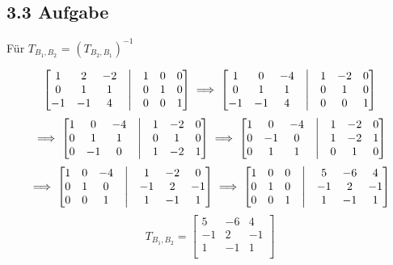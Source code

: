 \documentclass{report}
\begin{document}
\subsection*{3.3 Aufgabe}

Für $T_{B_1,B_2}$ = $(T_{B_2,B_1})^{-1}$

\[
\begin{bmatrix}
    1 & 2 & -2  &\bigm| & 1 & 0 & 0 \\
    0 & 1 & 1   &\bigm| & 0 & 1 & 0 \\
    -1 & -1 & 4  &\bigm| & 0 & 0 & 1 \\ 
\end{bmatrix} \implies
\begin{bmatrix}
    1 & 0 & -4  &\bigm| & 1 & -2 & 0 \\
    0 & 1 & 1   &\bigm| & 0 & 1 & 0 \\
    -1 & -1 & 4  &\bigm| & 0 & 0 & 1 \\ 
\end{bmatrix} 
\]
\[
\implies\begin{bmatrix}
    1 & 0 & -4  &\bigm| & 1 & -2 & 0 \\
    0 & 1 & 1   &\bigm| & 0 & 1 & 0 \\
    0 & -1 & 0  &\bigm| & 1 & -2 & 1 \\ 
\end{bmatrix} \implies
\begin{bmatrix}
    1 & 0 & -4  &\bigm| & 1 & -2 & 0 \\
    0 & -1 & 0  &\bigm| & 1 & -2 & 1 \\ 
    0 & 1 & 1   &\bigm| & 0 & 1 & 0 \\
\end{bmatrix}
\]
\[
\implies\begin{bmatrix}
    1 & 0 & -4  &\bigm| & 1 & -2 & 0 \\
    0 & 1 & 0   &\bigm| & -1 & 2 & -1 \\
    0 & 0 & 1  &\bigm| & 1 & -1 & 1 \\ 
\end{bmatrix} \implies
\begin{bmatrix}
    1 & 0 & 0  &\bigm| & 5 & -6 & 4 \\
    0 & 1 & 0  &\bigm| & -1 & 2 & -1 \\ 
    0 & 0 & 1   &\bigm| & 1 & -1 & 1 \\
\end{bmatrix}
\]
\[
T_{B_1,B_2} = \begin{bmatrix}
    5 & -6 & 4 \\
    -1 & 2 & -1 \\
    1 & -1 & 1 \\ 
\end{bmatrix}
\]
\end{document}
